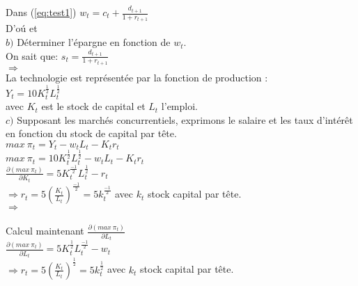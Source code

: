 \documentclass[11pt,twoside,a4paper]{article}
\begin{document}
Dans (\ref{eq:test1})\: $ w_t=c_t + \frac{d_{t+1}}{1+r_{t+1}}$ \\

D'o\'{u} \:
  \: et \: \\
 
 
 $b)$  Déterminer l'épargne en fonction de $w_t$.\\
 
 On sait que: $ s_t = \frac{d_{t+1}}{1+r_{t+1}} $\\
 
 $ \Rightarrow$   \\
 
 La technologie est représentée par la fonction de production :\\
 
 $Y_t=10K_t^{\frac{1}{2}}L_t^{\frac{1}{2}}$\\
 
 avec $K_t$ est le stock de capital et $L_t$ l'emploi.\\
 
 $c)$ Supposant les marchés concurrentiels, exprimons le salaire et les taux d'intér\^{e}t
en fonction du stock de capital par t\^{e}te.\\

$ max\ \pi_t= Y_t -w_tL_t-K_t r_t $\\

 $ max\ \pi_t=10K_t^{\frac{1}{2}}L_t^{\frac{1}{2}}-w_tL_t-K_t r_t $\\
 
 $
  \frac{\partial (max\ \pi_t)}{\partial K_t}=5K_t^{\frac{-1}{2}}L_t^{\frac{1}{2}}-r_t $\\
 
$ \Rightarrow r_t= 5(\frac{K_t}{L_t})^{\frac{-1}{2}}=5k_t^{\frac{-1}{2}}$ \: avec $k_t$ stock capital par t\^{e}te.\\


 $ \Rightarrow$   \\
 \\Calcul maintenant $\frac{\partial (max\ \pi_t)}{\partial L_t}$\\
 
 $\frac{\partial (max\ \pi_t)}{\partial L_t}=5K_t^{\frac{1}{2}}L_t^{\frac{-1}{2}}-w_t$\\
 
 $ \Rightarrow r_t= 5(\frac{K_t}{L_t})^{\frac{1}{2}}=5k_t^{\frac{1}{2}}$ \: avec $k_t$ stock capital par t\^{e}te.\\
\end{document}

